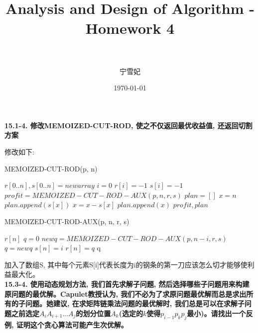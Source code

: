 \documentclass[paper=a4, fontsize=11pt]{scrartcl} %
\title{	
\normalfont \normalsize 
\horrule{0.5pt} \\[0.4cm] %
\huge Analysis and Design of Algorithm - Homework 4\\ %
\horrule{2pt} \\[0.5cm] %
}
\author{宁雪妃} %
\date{\normalsize\today} %
\numberwithin{equation}{section} %
\numberwithin{figure}{section} %
\numberwithin{table}{section} %
\begin{document}
\maketitle %



\textbf{15.1-4. 修改MEMOIZED-CUT-ROD, 使之不仅返回最优收益值, 还返回切割方案}

修改如下:
\begin{algorithm}[ht]
  \caption{MEMOIZED-CUT-ROD(p, n)}
  \begin{algorithmic}[1]
  \State $r[0..n], s[0..n] = new array$
  \State $i = 0$
  \State $ r[i] = -1$
  \State $ s[i] = -1$
  \EndFor
  \State $profit = MEMOIZED-CUT-ROD-AUX(p, n, r, s)$
  \State $plan = []$
  \State $x = n$
  \State $plan.append(s[x])$
  \State $x = x - s[x]$
  \EndWhile
  \State $plan.append(x)$
  \State\Return $profit, plan$
  \end{algorithmic}
\end{algorithm}

\begin{algorithm}[ht]
  \caption{MEMOIZED-CUT-ROD-AUX(p, n, r, s)}
  \begin{algorithmic}[1]
    \Return $r[n]$
    \EndIf
    \State $q = 0$
    \Else
    \State $newq = MEMOIZED-CUT-ROD-AUX(p, n-i, r, s)$
    \State $q = newq$
    \State $s[n] = i$
    \EndIf
    \EndFor
    \EndIf
    \State $r[n] = q$
    \State\Return q
  \end{algorithmic}
\end{algorithm}
加入了数组S, 其中每个元素S[i]代表长度为i的钢条的第一刀应该怎么切才能够使利益最大化。
\\[4ex]

\textbf{15.3-4. 使用动态规划方法, 我们首先求解子问题, 然后选择哪些子问题用来构建原问题的最优解。Capulet教授认为, 我们不必为了求原问题最优解而总是求出所有的子问题。她建议, 在求矩阵链乘法问题的最优解时, 我们总是可以在求解子问题之前选定$A_iA_{i+1} \dots A_j$的划分位置$A_k$(选定的$k$使得$p_{i-1}p_kp_j$最小)。请找出一个反例, 证明这个贪心算法可能产生次优解。}
\end{document}
